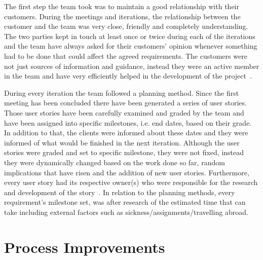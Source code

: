 \documentclass{l3proj}
\begin{document}
The first step the team took was to maintain a good relationship with their customers. During the meetings and iterations, the relationship between the customer and the team was very close, friendly and completely understanding. The two parties kept in touch at least once or twice during each of the iterations and the team have always asked for their customers' opinion whenever something had to be done that could affect the agreed requirements. The customers were not just sources of information and guidance, instead they were an active member in the team and have very efficiently helped in the development of the project~\cite{Customers}.

During every iteration the team followed a planning method. Since the first meeting has been concluded there have been generated a series of user stories. Those user stories have been carefully examined and graded by the team and have been assigned into specific milestones, i.e. end dates, based on their grade. In addition to that, the clients were informed about these dates and they were informed of what would be finished in the next iteration. Although the user stories were graded and set to specific milestone, they were not fixed, instead they were dynamically changed based on the work done so far, random implications that have risen and the addition of new user stories. Furthermore, every user story had its respective owner(s) who were responsible for the research and development of the story~\cite{UserStories}. In relation to the planning methods, every requirement's milestone set, was after research of the estimated time that can take including external factors such as sickness/assignments/travelling abroad.


\section{Process Improvements}
\label{sec:process-improvements}
\end{document}

